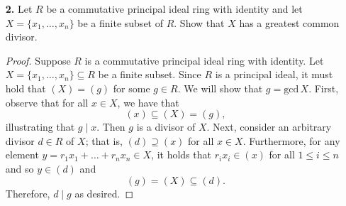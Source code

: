 \documentclass[ 12pt ]{article}
\begin{document}
\begin{enumerate}
\begin{proof}
		\end{proof}


	\item[\textbf{2.}] Let $R$ be a commutative principal ideal ring with identity and let $X = \{x_1, \hdots, x_n\}$ be a finite subset of $R$. Show that $X$ has a greatest common divisor.

		\begin{proof}
			Suppose $R$ is a commutative principal ideal ring with identity. Let $X = \{x_1, \hdots, x_n\} \subseteq R$ be a finite subset. Since $R$ is a principal ideal, it must hold that $(X) = (g)$ for some $g \in R$. We will show that $g = \mathrm{gcd}\, X$. First, observe that for all $x \in X$, we have that $$(x) \subseteq (X) = (g),$$ illustrating that $g \mid x$. Then $g$ is a divisor of $X$. Next, consider an arbitrary divisor $d \in R$ of $X$; that is, $(d) \supseteq (x)$ for all $x \in X$. Furthermore, for any element $y = r_1 x_1 + \hdots + r_n x_n \in X$, it holds that $r_i x_i \in (x)$ for all $1 \leq i \leq n$ and so $y \in (d)$ and $$(g) = (X) \subseteq (d).$$ Therefore, $d \mid g$ as desired.
		\end{proof}


\end{enumerate}
\end{document}
